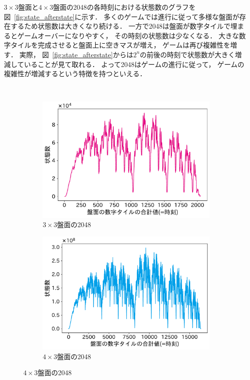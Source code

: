 $3\times3$盤面と$4\times3$盤面の2048の各時刻における状態数のグラフを図~\ref{fig:state_afterstate}に示す．
多くのゲームでは進行に従って多様な盤面が存在するため状態数は大きくなり続ける．
一方で2048は盤面が数字タイルで埋まるとゲームオーバーになりやすく， その時刻の状態数は少なくなる．
大きな数字タイルを完成させると盤面上に空きマスが増え， ゲームは再び複雑性を増す．
実際， 図~\ref{fig:state_afterstate}からは$2^n$の前後の時刻で状態数が大きく増減していることが見て取れる．
よって2048はゲームの進行に従って， ゲームの複雑性が増減するという特徴を持つといえる．
\begin{figure}　
\vspace{0.2cm}
\begin{subfigure}[T]{0.4\columnwidth}
    \centering
    \includegraphics[width=\columnwidth]{figures/graph_mini.pdf}
    \caption{$3\times3$盤面の2048}
    \label{fig:graph_mini}
\end{subfigure}
\hspace{1cm}
\begin{subfigure}[T]{0.4\columnwidth}
    \centering
    \includegraphics[width=\columnwidth]{figures/graph_mid.pdf}
    \caption{$4\times3$盤面の2048}
    \label{fig:graph_mid}
\end{subfigure}
\label{fig:time_state_num}
\end{figure}

